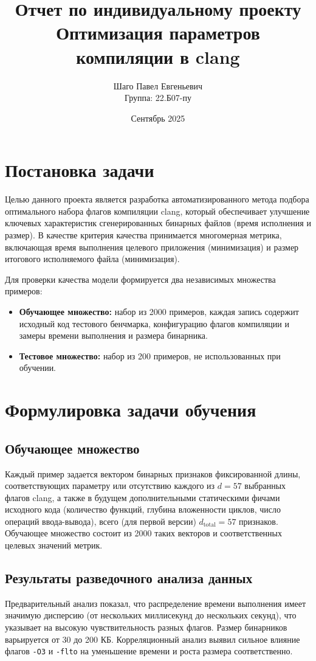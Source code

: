 \documentclass[a4paper,12pt]{article}
\title{Отчет по индивидуальному проекту\\Оптимизация параметров компиляции в clang}
\author{Шаго Павел Евгеньевич\\Группа: 22.Б07-пу}
\date{Сентябрь 2025}
\begin{document}
\maketitle

\section{Постановка задачи}
Целью данного проекта является разработка автоматизированного метода подбора оптимального
набора флагов компиляции clang, который обеспечивает улучшение ключевых характеристик
сгенерированных бинарных файлов (время исполнения и размер). В качестве критерия качества
принимается многомерная метрика, включающая время выполнения целевого приложения
(минимизация) и размер итогового исполняемого файла (минимизация).

Для проверки качества модели формируется два независимых множества примеров:
\begin{itemize}
  \item \textbf{Обучающее множество:} набор из 2000 примеров, каждая запись содержит исходный код тестового бенчмарка, конфигурацию флагов компиляции и замеры времени выполнения и размера бинарника.
  \item \textbf{Тестовое множество:} набор из 200 примеров, не использованных
    при обучении.
\end{itemize}

\newpage
\section{Формулировка задачи обучения}
\subsection{Обучающее множество}
Каждый пример задается вектором бинарных признаков фиксированной длины,
соответствующих параметру или отсутствию каждого из $d=57$ выбранных флагов clang,
а также в будущем дополнительными статическими фичами исходного кода 
(количество функций, глубина вложенности циклов, число операций ввода-вывода),
всего (для первой версии) $d_{\text{total}}=57$ признаков. Обучающее множество
состоит из 2000 таких векторов и соответственных целевых значений метрик.

\subsection{Результаты разведочного анализа данных}
Предварительный анализ показал, что распределение времени выполнения имеет значимую дисперсию (от нескольких миллисекунд до нескольких секунд), что указывает на высокую чувствительность разных флагов. Размер бинарников варьируется от 30 до 200 КБ. Корреляционный анализ выявил сильное влияние флагов \texttt{-O3} и \texttt{-flto} на уменьшение времени и роста размера соответственно.
\end{document}
